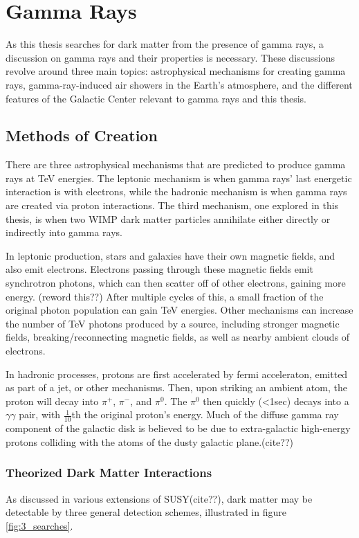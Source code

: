 \cleartooddpage[\thispagestyle{empty}]
\chapter{Gamma Rays}

As this thesis searches for dark matter from the presence of gamma rays, a discussion on gamma rays and their properties is necessary.
These discussions revolve around three main topics: astrophysical mechanisms for creating gamma rays, gamma-ray-induced air showers in the Earth's atmosphere, and the different features of the Galactic Center relevant to gamma rays and this thesis.


\section{Methods of Creation}

There are three astrophysical mechanisms that are predicted to produce gamma rays at TeV energies.
The leptonic mechanism is when gamma rays' last energetic interaction is with electrons, while the hadronic mechanism is when gamma rays are created via proton interactions.
The third mechanism, one explored in this thesis, is when two WIMP dark matter particles annihilate either directly or indirectly into gamma rays.

In leptonic production, stars and galaxies have their own magnetic fields, and also emit electrons.
Electrons passing through these magnetic fields emit synchrotron photons, which can then scatter off of other electrons, gaining more energy. (reword this??)
After multiple cycles of this, a small fraction of the original photon population can gain TeV energies.
Other mechanisms can increase the number of TeV photons produced by a source, including stronger magnetic fields, breaking/reconnecting magnetic fields, as well as nearby ambient clouds of electrons.

In hadronic processes, protons are first accelerated by fermi acceleraton, emitted as part of a jet, or other mechanisms.
Then, upon striking an ambient atom, the proton will decay into $\pi^{+}$, $\pi^{-}$, and $\pi^{0}$.
The $\pi^{0}$ then quickly (<1sec) decays into a $\gamma\gamma$ pair, with \nicetilde $\frac{1}{10}$th the original proton's energy.
Much of the diffuse gamma ray component of the galactic disk is believed to be due to extra-galactic high-energy protons colliding with the atoms of the dusty galactic plane.(cite??)


\subsection{Theorized Dark Matter Interactions}
As discussed in various extensions of SUSY(cite??), dark matter may be detectable by three general detection schemes, illustrated in figure \ref{fig:3_searches}.

